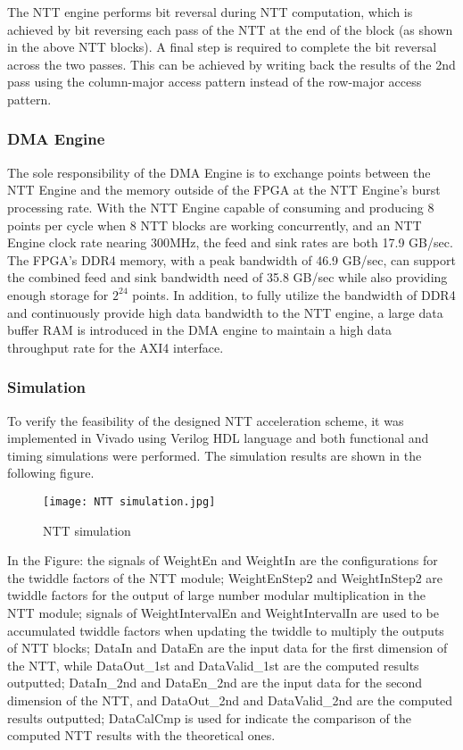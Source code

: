 The NTT engine performs bit reversal during NTT computation, which is achieved by bit reversing each pass of the NTT at the end of the block (as shown in the above NTT blocks). A final step is required to complete the bit reversal across the two passes. This can be achieved by writing back the results of the 2nd pass using the column-major access pattern instead of the row-major access pattern.


\subsubsection{DMA Engine}

The sole responsibility of the DMA Engine is to exchange points between the NTT Engine and the memory outside of the FPGA at the NTT Engine's burst processing rate. With the NTT Engine capable of consuming and producing 8 points per cycle when 8 NTT blocks are working concurrently, and an NTT Engine clock rate nearing 300MHz, the feed and sink rates are both 17.9 GB/sec. The FPGA's DDR4 memory, with a peak bandwidth of 46.9 GB/sec, can support the combined feed and sink bandwidth need of 35.8 GB/sec while also providing enough storage for $2^{24}$ points.
  In addition, to fully utilize the bandwidth of DDR4 and continuously provide high data bandwidth to the NTT engine, a large data buffer RAM is introduced in the DMA engine to maintain a high data throughput rate for the AXI4 interface.

\subsubsection{Simulation}

To verify the feasibility of the designed NTT acceleration scheme, it was implemented in Vivado using Verilog HDL language and both functional and timing simulations were performed. The simulation results are shown in the following figure.

\begin{figure}[h]
  \centering
  \texttt{[image: NTT simulation.jpg]}
  \caption{NTT simulation}
  \label{fig:NTT_Simu}
\end{figure}

In the Figure: the signals of WeightEn and WeightIn are the configurations for the twiddle factors of the NTT module; WeightEnStep2 and WeightInStep2 are twiddle factors for the output of large number modular multiplication in the NTT module; signals of WeightIntervalEn and WeightIntervalIn are used to be accumulated twiddle factors when updating the twiddle to multiply the outputs of NTT blocks; DataIn and DataEn are the input data for the first dimension of the NTT, while DataOut\_1st and DataValid\_1st are the computed results outputted; DataIn\_2nd and DataEn\_2nd are the input data for the second dimension of the NTT, and DataOut\_2nd and DataValid\_2nd are the computed results outputted; DataCalCmp is used for indicate the comparison of the computed NTT results with the theoretical ones.

